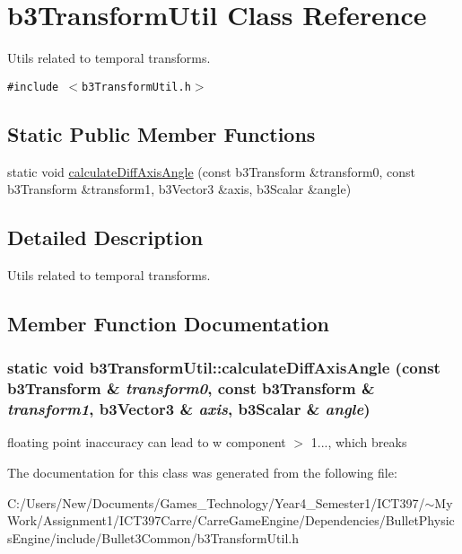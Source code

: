\hypertarget{classb3_transform_util}{
\section{b3TransformUtil Class Reference}
\label{classb3_transform_util}
}
Utils related to temporal transforms.  


{\tt \#include $<$b3TransformUtil.h$>$}

\subsection*{Static Public Member Functions}
\begin{CompactItemize}
\item 
static void \hyperlink{classb3_transform_util_077905e76e231101930678ace3bd444a}{calculateDiffAxisAngle} (const b3Transform \&transform0, const b3Transform \&transform1, b3Vector3 \&axis, b3Scalar \&angle)
\end{CompactItemize}


\subsection{Detailed Description}
Utils related to temporal transforms. 

\subsection{Member Function Documentation}
\hypertarget{classb3_transform_util_077905e76e231101930678ace3bd444a}{
\subsubsection[calculateDiffAxisAngle]{\setlength{\rightskip}{0pt plus 5cm}static void b3TransformUtil::calculateDiffAxisAngle (const b3Transform \& {\em transform0}, \/  const b3Transform \& {\em transform1}, \/  b3Vector3 \& {\em axis}, \/  b3Scalar \& {\em angle})}}
\label{classb3_transform_util_077905e76e231101930678ace3bd444a}




floating point inaccuracy can lead to w component $>$ 1..., which breaks 

The documentation for this class was generated from the following file:\begin{CompactItemize}
\item 
C:/Users/New/Documents/Games\_\-Technology/Year4\_\-Semester1/ICT397/$\sim$My Work/Assignment1/ICT397Carre/CarreGameEngine/Dependencies/BulletPhysicsEngine/include/Bullet3Common/b3TransformUtil.h\end{CompactItemize}
